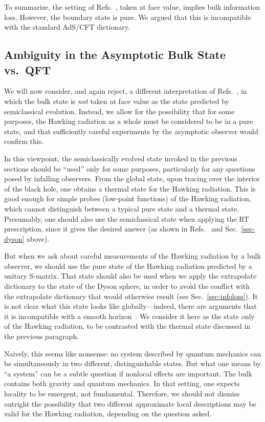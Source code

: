 \documentclass[12pt,letterpaper]{article}
\begin{document}
To summarize, the setting of Refs.~\cite{Pen19,AEMM}, taken at face value, implies bulk information loss. However, the boundary state is pure. We argued that this is incompatible with the standard AdS/CFT dictionary.


\subsection{Ambiguity in the Asymptotic Bulk State vs.\ QFT}
\label{sec-firstcommandment}

We will now consider, and again reject, a different interpretation of Refs.~\cite{Pen19,AEMM}, in which the bulk state is {\em not\/} taken at face value as the state predicted by semiclassical evolution. Instead, we allow for the possibility that for some purposes, the Hawking radiation as a whole must be considered to be in a pure state, and that sufficiently careful experiments by the asymptotic observer would confirm this.

In this viewpoint, the semiclassically evolved state invoked in the previous sections should be ``used'' only for some purposes, particularly for any questions posed by infalling observers. From the global state, upon tracing over the interior of the black hole, one obtains a thermal state for the Hawking radiation. This is good enough for simple probes (low-point functions) of the Hawking radiation, which cannot distinguish between a typical pure state and a thermal state. Presumably, one should also use the semiclassical state when applying the RT prescription, since it gives the desired answer (as shown in Refs.~\cite{Pen19,AEMM} and Sec.~\ref{sec-dyson} above).

But when we ask about careful measurements of the Hawking radiation by a bulk observer, we should use the pure state of the Hawking radiation predicted by a unitary S-matrix. That state should also be used when we apply the extrapolate dictionary to the state of the Dyson sphere, in order to avoid the conflict with the extrapolate dictionary that would otherwise result (see Sec.~\ref{sec-infoloss}). It is not clear what this state looks like globally---indeed, there are arguments that it is incompatible with a smooth horizon~\cite{Haw76,AMPS}. We consider it here as the state only of the Hawking radiation, to be contrasted with the thermal state discussed in the previous paragraph.

Naively, this seems like nonsense: no system described by quantum mechanics can be simultaneously in two different, distinguishable states. But what one means by ``a system'' can be a subtle question if nonlocal effects are important. The bulk contains both gravity and quantum mechanics. In that setting, one expects locality to be emergent, not fundamental. Therefore, we should not dismiss outright the possibility that two different approximate local descriptions may be valid for the Hawking radiation, depending on the question asked.
\end{document}
